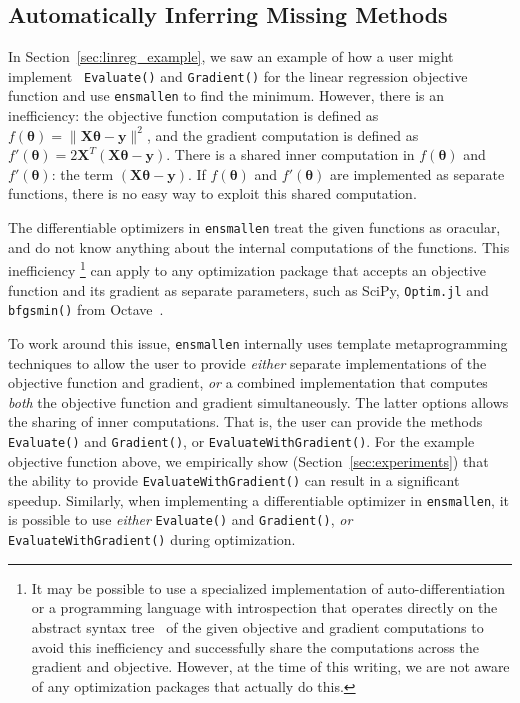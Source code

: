 \subsection{Automatically Inferring Missing Methods}
\label{sec:automatic}

In Section~\ref{sec:linreg_example}, we saw an example of how a user might implement {\tt
Evaluate()} and {\tt Gradient()} for the linear regression objective function
and use {\tt ensmallen} to find the minimum.
However, there is an inefficiency:
the objective function computation is defined as $f(\bm \theta) = \| \bm X \bm \theta - \bm y \|^2$,
and the gradient computation is defined as $f'(\bm \theta) = 2 \bm X^T (\bm X \bm \theta - \bm y)$.
There is a shared inner computation in $f(\bm \theta)$ and $f'(\bm \theta)$: the
term $(\bm X \bm \theta - \bm y)$.
If $f(\bm \theta)$ and $f'(\bm \theta)$ are implemented as separate functions,
there is no easy way to exploit this shared computation.

The differentiable optimizers in {\tt ensmallen} treat the given functions as oracular,
and do not know anything about the internal computations of the functions.
This inefficiency%
\footnote
  {It may be possible to use a specialized implementation of
  auto-differentiation or a programming language with introspection that
  operates directly on the abstract syntax tree~\cite{Jones_AST_2003} of the
  given objective and gradient computations to avoid this inefficiency and
  successfully share the computations across the gradient and objective.
  However, at the time of this writing, we are not aware of any optimization
  packages that actually do this.
  }
can apply to any optimization package that accepts an objective
function and its gradient as separate parameters,
such as SciPy, {\tt Optim.jl} and {\tt bfgsmin()} from Octave~\cite{octave}.

To work around this issue, {\tt ensmallen} internally uses template metaprogramming techniques to allow
the user to provide {\it either} separate implementations of the objective
function and gradient, {\it or} a combined implementation that computes {\it
both} the objective function and gradient simultaneously.
The latter options allows the sharing of inner computations.
That is, the user can provide the methods {\tt Evaluate()} and {\tt Gradient()},
or {\tt EvaluateWithGradient()}.
For the example objective function above,
we empirically show (Section~\ref{sec:experiments}) that the ability to provide
{\tt EvaluateWithGradient()} can result in a significant speedup.
Similarly, when implementing a differentiable optimizer in {\tt ensmallen},
it is possible to use {\it either} {\tt Evaluate()} and {\tt Gradient()},
{\it or} {\tt EvaluateWithGradient()} during optimization.

